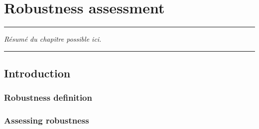 
\lhead[\fancyplain{}{\leftmark}]%
      {\fancyplain{}{}} %
\chead[\fancyplain{}{}]%
      {\fancyplain{}{}}
\rhead[\fancyplain{}{}]%
      {\fancyplain{}{\rightmark}}%
\lfoot[\fancyplain{}{}]%
      {\fancyplain{}{}}
\cfoot[\fancyplain{}{\thepage}]%
      {\fancyplain{}{\thepage}} %
\rfoot[\fancyplain{}{}]%
     {\fancyplain{}{\scriptsize}}



\chapter{Robustness assessment}
\label{ch:4}


\begin{center}
\rule{0.7\linewidth}{.5pt}
\begin{minipage}{0.7\linewidth}
\smallskip

\textit{Résumé du chapitre possible ici.
}

\end{minipage}
\smallskip
\rule{0.7\linewidth}{.5pt}
\end{center}

\minitoc
\newpage


\section{Introduction}
\subsection{Robustness definition}
\blindtext

\subsection{Assessing robustness}
\blindtext


